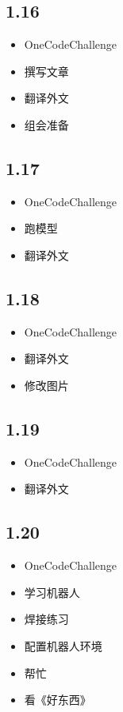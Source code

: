 \documentclass[UTF8]{ctexart}
\begin{document}
\subsection*{1.16}
\begin{itemize}
    \item OneCodeChallenge
    \item 撰写文章
    \item 翻译外文
    \item 组会准备
\end{itemize}

\subsection*{1.17}
\begin{itemize}
    \item OneCodeChallenge
    \item 跑模型
    \item 翻译外文
\end{itemize}

\subsection*{1.18}
\begin{itemize}
    \item OneCodeChallenge
    \item 翻译外文
    \item 修改图片
\end{itemize}

\subsection*{1.19}
\begin{itemize}
    \item OneCodeChallenge
    \item 翻译外文
\end{itemize}

\subsection*{1.20}
\begin{itemize}
    \item OneCodeChallenge
    \item 学习机器人
    \item 焊接练习
    \item 配置机器人环境
    \item 帮忙
    \item 看《好东西》
\end{itemize}
\end{document}
